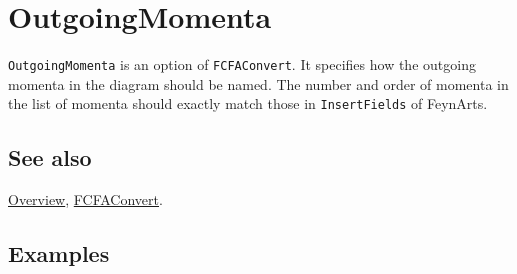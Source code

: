 \documentclass[../FeynCalcManual.tex]{subfiles}
\begin{document}
\hypertarget{outgoingmomenta}{
\section{OutgoingMomenta}\label{outgoingmomenta}}

\texttt{OutgoingMomenta} is an option of \texttt{FCFAConvert}. It
specifies how the outgoing momenta in the diagram should be named. The
number and order of momenta in the list of momenta should exactly match
those in \texttt{InsertFields} of FeynArts.

\subsection{See also}

\hyperlink{toc}{Overview}, \hyperlink{fcfaconvert}{FCFAConvert}.

\subsection{Examples}
\end{document}
